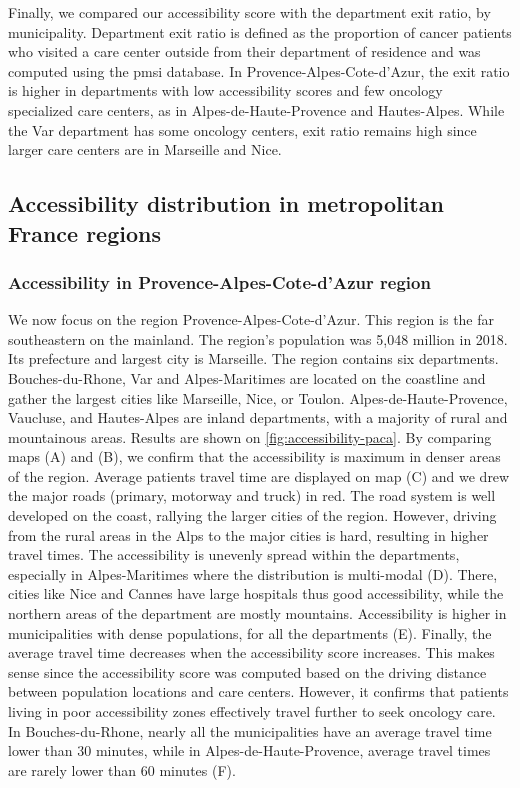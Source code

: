 Finally, we compared our accessibility score with the department exit ratio, by
municipality. Department exit ratio is defined as the proportion of cancer
patients who visited a care center outside from their department of residence
and was computed using the \ac{pmsi} database. In Provence-Alpes-Cote-d'Azur,
the exit ratio is higher in departments with low accessibility scores and few
oncology specialized care centers, as in Alpes-de-Haute-Provence and
Hautes-Alpes. While the Var department has some oncology centers, exit ratio
remains high since larger care centers are in Marseille and Nice.

\subsection{Accessibility distribution in metropolitan France regions}

\subsubsection{Accessibility in Provence-Alpes-Cote-d'Azur region}

We now focus on the region Provence-Alpes-Cote-d'Azur. This region is the far
southeastern on the mainland. The region's population was 5,048 million in 2018.
Its prefecture and largest city is Marseille. The region contains six
departments. Bouches-du-Rhone, Var and Alpes-Maritimes are located on the
coastline and gather the largest cities like Marseille, Nice, or Toulon.
Alpes-de-Haute-Provence, Vaucluse, and Hautes-Alpes are inland departments, with
a majority of rural and mountainous areas. Results are shown on
\cref{fig:accessibility-paca}. By comparing maps (A) and (B), we confirm that
the accessibility is maximum in denser areas of the region. Average patients
travel time are displayed on map (C) and we drew the major roads (primary,
motorway and truck) in red. The road system is well developed on the coast,
rallying the larger cities of the region. However, driving from the rural areas
in the Alps to the major cities is hard, resulting in higher travel times. The
accessibility is unevenly spread within the departments, especially in
Alpes-Maritimes where the distribution is multi-modal (D). There, cities like
Nice and Cannes have large hospitals thus good accessibility, while the northern
areas of the department are mostly mountains. Accessibility is higher in
municipalities with dense populations, for all the departments (E). Finally, the
average travel time decreases when the accessibility score increases. This makes
sense since the accessibility score was computed based on the driving distance
between population locations and care centers. However, it confirms that
patients living in poor accessibility zones effectively travel further to seek
oncology care. In Bouches-du-Rhone, nearly all the municipalities have an
average travel time lower than 30 minutes, while in Alpes-de-Haute-Provence,
average travel times are rarely lower than 60 minutes (F).

